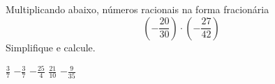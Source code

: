 Multiplicando abaixo, números racionais na forma fracionária
\[\left(-\frac{20}{30}\right)\cdot\left(-\frac{27}{42}\right)\]
Simplifique e calcule.

$ \frac{3}{7}$
$-\frac{3}{7}$
$-\frac{25}{4}$
$ \frac{21}{10}$
$-\frac{9}{35}$



